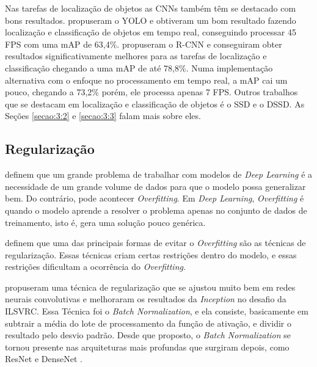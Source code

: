 Nas tarefas de localização de objetos as \ac{CNN}s também têm se destacado com bons resultados.  propuseram o \ac{YOLO} e obtiveram um bom resultado fazendo localização e classificação de objetos em tempo real, conseguindo processar 45 \ac{FPS} com uma \ac{mAP} de 63,4\%.  propuseram o \ac{R-CNN} e conseguiram obter resultados significativamente melhores para as tarefas de localização e classificação chegando a uma \ac{mAP} de até 78,8\%. Numa implementação alternativa com o enfoque no processamento em tempo real, a \ac{mAP} cai um pouco, chegando a 73,2\% porém, ele processa apenas 7 \ac{FPS}. Outros trabalhos que se destacam em localização e classificação de objetos é o \ac{SSD} e o \ac{DSSD}. As Seções \ref{secao:3:2} e \ref{secao:3:3} falam mais sobre eles.

\subsection{Regularização}
\label{subsecao:2:3:2}

 definem que um grande problema de trabalhar com modelos de \textit{Deep Learning} é a necessidade de um grande volume de dados para que o modelo possa generalizar bem. Do contrário, pode acontecer \textit{Overfitting}. Em \textit{Deep Learning}, \textit{Overfitting} é quando o modelo aprende a resolver o problema apenas no conjunto de dados de treinamento, isto é, gera uma solução pouco genérica.

 definem que uma das principais formas de evitar o \textit{Overfitting} são as técnicas de regularização. Essas técnicas criam certas restrições dentro do modelo, e essas restrições dificultam a ocorrência do \textit{Overfitting}.

 propuseram uma técnica de regularização que se ajustou muito bem em redes neurais convolutivas e melhoraram os resultados da \textit{Inception} \cite{szegedy-2015} no desafio da \ac{ILSVRC}. Essa Técnica foi o \textit{Batch Normalization}, e ela consiste, basicamente em subtrair a média do lote de processamento da função de ativação, e dividir o resultado pelo desvio padrão. Desde que proposto, o \textit{Batch Normalization} se tornou presente nas arquiteturas mais profundas que surgiram depois, como \ac{ResNet} \cite{he-2016} e \ac{DenseNet} \cite{liu-2017}.


